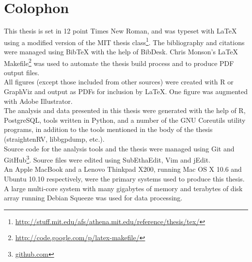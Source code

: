 \cleardoublepage
{}
{}
\chapter*{Colophon}
\begin{singlespace}
\noindent
This thesis is set in 12 point Times New Roman, and was typeset with \LaTeX{}
using a modified version of the MIT thesis class\footnote{
\url{http://stuff.mit.edu/afs/athena.mit.edu/reference/thesis/tex/}}.
The bibliography and citations were managed using {{\sc Bib}\TeX} with the help
of BibDesk. Chris Monson's \LaTeX{} Makefile\footnote{
\url{http://code.google.com/p/latex-makefile/}} was used to automate the thesis
build process and to produce PDF output files.
\\

\noindent
All figures (except those included from other sources) were created with R or
GraphViz and output as PDFs for inclusion by \LaTeX{}. One figure was augmented
with Adobe Illustrator.
\\

\noindent
The analysis and data presented in this thesis were generated with the help of
R, PostgreSQL, tools written in Python, and a number of the GNU Coreutils
utility programs, in addition to the tools mentioned in the body of the thesis
(straightenRV, libbgpdump, etc.).
\\

\noindent
Source code for the analysis tools and the thesis were managed using Git and
GitHub\footnote{\url{github.com}}. Source files were edited using SubEthaEdit,
Vim and jEdit.
\\

\noindent
An Apple MacBook and a Lenovo Thinkpad X200, running Mac OS X 10.6 and Ubuntu
10.10 respectively, were the primary systems used to produce this thesis. A
large multi-core system with many gigabytes of memory and terabytes of disk
array running Debian Squeeze was used for data processing.
\\

\end{singlespace}
